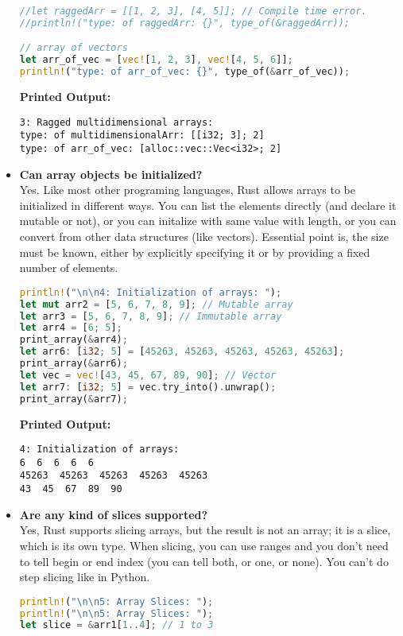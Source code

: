 \documentclass{article}
\begin{document}
\begin{itemize}
\begin{lstlisting}[language=Rust]
//let raggedArr = [[1, 2, 3], [4, 5]]; // Compile time error.
//println!("type: of raggedArr: {}", type_of(&raggedArr)); 

// array of vectors
let arr_of_vec = [vec![1, 2, 3], vec![4, 5, 6]];
println!("type: of arr_of_vec: {}", type_of(&arr_of_vec));
\end{lstlisting}
\textbf{Printed Output:}
\begin{verbatim}
3: Ragged multidimensional arrays: 
type: of multidimensionalArr: [[i32; 3]; 2]
type: of arr_of_vec: [alloc::vec::Vec<i32>; 2]
\end{verbatim}


\item \textbf{Can array objects be initialized?} \\
Yes. Like most other programing languages, Rust allows arrays to be initialized in different ways. You can list the elements directly (and declare it mutable or not), or you can initalize with same value with length, or you can convert from other data structures (like vectors). Essential point is, the size must be known, either by explicitly specifying it or by providing a fixed number of elements.
\begin{lstlisting}[language=Rust]
println!("\n\n4: Initialization of arrays: ");
let mut arr2 = [5, 6, 7, 8, 9]; // Mutable array
let arr3 = [5, 6, 7, 8, 9]; // Immutable array
let arr4 = [6; 5];
print_array(&arr4);
let arr6: [i32; 5] = [45263, 45263, 45263, 45263, 45263];
print_array(&arr6);
let vec = vec![43, 45, 67, 89, 90]; // Vector
let arr7: [i32; 5] = vec.try_into().unwrap();
print_array(&arr7);
\end{lstlisting}
\textbf{Printed Output:}
\begin{verbatim}
4: Initialization of arrays: 
6  6  6  6  6   
45263  45263  45263  45263  45263   
43  45  67  89  90 
\end{verbatim}



\item \textbf{Are any kind of slices supported?} \\
Yes, Rust supports slicing arrays, but the result is not an array; it is a slice, which is its own type. When slicing, you can use ranges and you don't need to tell begin or end index (you can tell both, or one, or none). You can't do step slicing like in Python.
\begin{lstlisting}[language=Rust]
println!("\n\n5: Array Slices: ");
println!("\n\n5: Array Slices: ");
let slice = &arr1[1..4]; // 1 to 3


\end{lstlisting}
\end{itemize}
\end{document}
